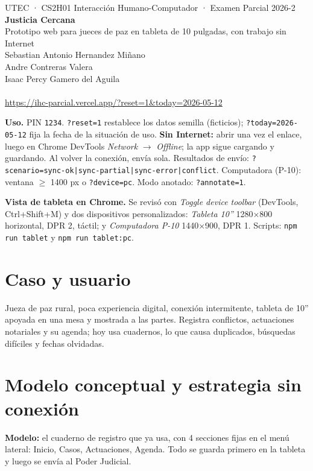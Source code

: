 \documentclass[11pt,a4paper]{article}
\begin{document}
\begin{center}
{\large UTEC · CS2H01 Interacción Humano-Computador · Examen Parcial 2026-2}\\[10pt]
{\LARGE\bfseries Justicia Cercana}\\[4pt]
{\large Prototipo web para jueces de paz en tableta de 10 pulgadas, con trabajo sin Internet}\\[12pt]
Sebastian Antonio Hernandez Miñano\\
Andre Contreras Valera\\
Isaac Percy Gamero del Aguila\\[12pt]
\\[4pt]
\url{https://ihc-parcial.vercel.app/?reset=1&today=2026-05-12}
\end{center}

\textbf{Uso.} PIN \texttt{1234}. \texttt{?reset=1} restablece los datos semilla (ficticios); \texttt{?today=2026-05-12} fija la fecha de la situación de uso. \textbf{Sin Internet:} abrir una vez el enlace, luego en Chrome DevTools \emph{Network} $\rightarrow$ \emph{Offline}; la app sigue cargando y guardando. Al volver la conexión, envía sola. Resultados de envío: \texttt{?scenario=sync-ok|sync-partial|sync-error|conflict}. Computadora (P-10): ventana $\geq$ 1400 px o \texttt{?device=pc}. Modo anotado: \texttt{?annotate=1}.

\textbf{Vista de tableta en Chrome.} Se revisó con \emph{Toggle device toolbar} (DevTools, Ctrl+Shift+M) y dos dispositivos personalizados: \emph{Tableta 10''} 1280×800 horizontal, DPR 2, táctil; y \emph{Computadora P-10} 1440×900, DPR 1. Scripts: \texttt{npm run tablet} y \texttt{npm run tablet:pc}.

\section{Caso y usuario}
Jueza de paz rural, poca experiencia digital, conexión intermitente, tableta de 10'' apoyada en una mesa y mostrada a las partes. Registra conflictos, actuaciones notariales y su agenda; hoy usa cuadernos, lo que causa duplicados, búsquedas difíciles y fechas olvidadas.

\section{Modelo conceptual y estrategia sin conexión}
\textbf{Modelo:} el cuaderno de registro que ya usa, con 4 secciones fijas en el menú lateral: Inicio, Casos, Actuaciones, Agenda. Todo se guarda primero en la tableta y luego se envía al Poder Judicial.
\end{document}

